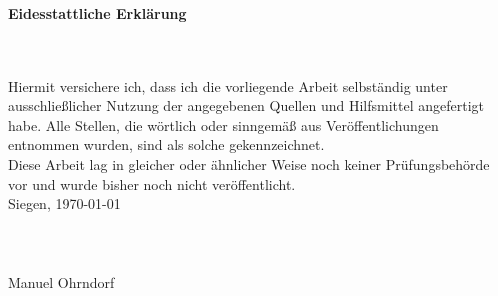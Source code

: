 \thispagestyle{empty}
\hfill{}\\
\hfill{}\\
\hfill{}\\
\begin{center}
\LARGE
\textbf{Eidesstattliche Erklärung}
\end{center}
\hfill{}\\
\hfill{}\\
Hiermit versichere ich, dass ich die vorliegende Arbeit selbständig
unter ausschließlicher Nutzung der angegebenen Quellen und Hilfsmittel angefertigt
habe. Alle Stellen, die wörtlich oder sinngemäß aus Veröffentlichungen entnommen wurden,
sind als solche gekennzeichnet.\\
Diese Arbeit lag in gleicher oder ähnlicher Weise noch keiner Prüfungsbehörde vor und wurde bisher noch nicht veröffentlicht.
\hfill{}\\

\noindent
Siegen, \today\\
\hfill{}\\
\hfill{}\\
\hfill{}\\
Manuel Ohrndorf




